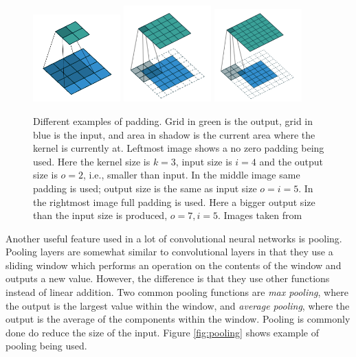  
 \begin{figure}[hbtp]
\begin{center}
\includegraphics[width = 0.3\textwidth]{./Images/noPad.png}
\includegraphics[width = 0.3\textwidth]{./Images/samePad.png}
\includegraphics[width = 0.3\textwidth]{./Images/fullPad.png} 
\caption{Different examples of padding. Grid in green is the output, grid in blue is the input, and area in shadow is the current area where the kernel is currently at. Leftmost image shows a no zero padding being used. Here the kernel size is $k = 3$, input size is $i = 4$ and the output size is  $o = 2$, i.e., smaller than input.  In the middle image same padding is used; output size is the same as input size $o = i = 5$. In the rightmost image full padding is used. Here a bigger output size than the input size is produced, $o = 7, i = 5$. Images taken from \cite{convArit}}
\label{fig:padding}
\end{center}
\end{figure}
 
 
 Another useful feature used in a lot of convolutional neural networks is pooling. Pooling layers are somewhat similar to convolutional layers in that they use a sliding window which performs an operation on the contents of the window and outputs a new value. However, the difference is that they use other functions instead of linear addition. Two common pooling functions are \textit{max pooling}, where the output is the largest value within the window, and \textit{average pooling}, where the output is the average of the components within the window.  Pooling is commonly done do reduce the size of the input. Figure \ref{fig:pooling} shows example of pooling being used.
 
